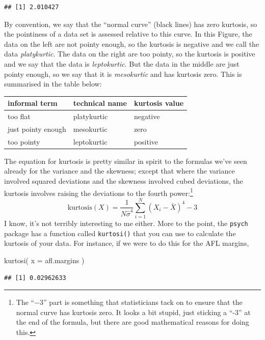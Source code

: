 \documentclass[
]{book}
\newenvironment{Shaded}{\begin{snugshade}}{\end{snugshade}}
\newcommand{\AttributeTok}[1]{\textcolor[rgb]{0.77,0.63,0.00}{#1}}
\newcommand{\FunctionTok}[1]{\textcolor[rgb]{0.00,0.00,0.00}{#1}}
\newcommand{\NormalTok}[1]{#1}
\begin{document}
\begin{verbatim}
## [1] 2.010427
\end{verbatim}

By convention, we say that the ``normal curve'' (black lines) has zero kurtosis, so the pointiness of a data set is assessed relative to this curve. In this Figure, the data on the left are not pointy enough, so the kurtosis is negative and we call the data \emph{platykurtic}. The data on the right are too pointy, so the kurtosis is positive and we say that the data is \emph{leptokurtic}. But the data in the middle are just pointy enough, so we say that it is \emph{mesokurtic} and has kurtosis zero. This is summarised in the table below:

\begin{tabular}{lll}
\toprule
informal term & technical name & kurtosis value\\
\midrule
too flat & platykurtic & negative\\
just pointy enough & mesokurtic & zero\\
too pointy & leptokurtic & positive\\
\bottomrule
\end{tabular}

The equation for kurtosis is pretty similar in spirit to the formulas we've seen already for the variance and the skewness; except that where the variance involved squared deviations and the skewness involved cubed deviations, the kurtosis involves raising the deviations to the fourth power:\footnote{The ``\(-3\)'' part is something that statisticians tack on to ensure that the normal curve has kurtosis zero. It looks a bit stupid, just sticking a ``-3'' at the end of the formula, but there are good mathematical reasons for doing this.}
\[
\mbox{kurtosis}(X) = \frac{1}{N \hat\sigma^4} \sum_{i=1}^N \left( X_i - \bar{X} \right)^4  - 3
\]
I know, it's not terribly interesting to me either. More to the point, the \texttt{psych} package has a function called \texttt{kurtosi()} that you can use to calculate the kurtosis of your data. For instance, if we were to do this for the AFL margins,

\begin{Shaded}
\begin{Highlighting}[]
\FunctionTok{kurtosi}\NormalTok{( }\AttributeTok{x =}\NormalTok{ afl.margins )}
\end{Highlighting}
\end{Shaded}

\begin{verbatim}
## [1] 0.02962633
\end{verbatim}
\end{document}

